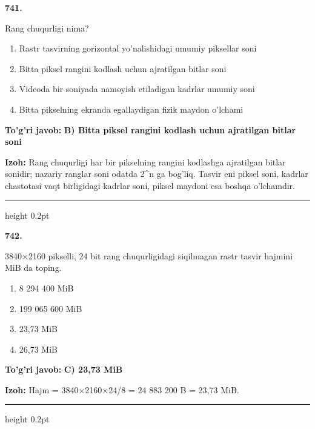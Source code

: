 \documentclass[10pt,a4paper,oneside]{article}
\begin{document}
\noindent\textbf{\color{ink}741.}
\par
Rang chuqurligi nima?
\begin{enumerate}[label=\Alph*),leftmargin=9mm]
\item Rastr tasvirning gorizontal yo'nalishidagi umumiy piksellar soni
\item Bitta piksel rangini kodlash uchun ajratilgan bitlar soni
\item Videoda bir soniyada namoyish etiladigan kadrlar umumiy soni
\item Bitta pikselning ekranda egallaydigan fizik maydon o'lchami
\end{enumerate}
\begin{tcolorbox}[enhanced,breakable,colback=teal!4,colframe=teal!50!black,boxrule=0.5pt,arc=1.1mm,left=3mm,right=3mm,top=1.7mm,bottom=1.7mm,before skip=2mm,after skip=2mm]
\textbf{\color{teal}To'g'ri javob:} \textbf{B) Bitta piksel rangini kodlash uchun ajratilgan bitlar soni}
\par\smallskip
\textbf{Izoh:} Rang chuqurligi har bir pikselning rangini kodlashga ajratilgan bitlar sonidir; nazariy ranglar soni odatda 2\textasciicircum{}n ga bog'liq. Tasvir eni piksel soni, kadrlar chastotasi vaqt birligidagi kadrlar soni, piksel maydoni esa boshqa o'lchamdir.
\end{tcolorbox}
\vspace{2mm}\hrule height 0.2pt \vspace{3mm}

\noindent\textbf{\color{ink}742.}
\par
3840\ensuremath{\times}2160 pikselli, 24 bit rang chuqurligidagi siqilmagan rastr tasvir hajmini MiB da toping.
\begin{enumerate}[label=\Alph*),leftmargin=9mm]
\item 8 294 400 MiB
\item 199 065 600 MiB
\item 23,73 MiB
\item 26,73 MiB
\end{enumerate}
\begin{tcolorbox}[enhanced,breakable,colback=teal!4,colframe=teal!50!black,boxrule=0.5pt,arc=1.1mm,left=3mm,right=3mm,top=1.7mm,bottom=1.7mm,before skip=2mm,after skip=2mm]
\textbf{\color{teal}To'g'ri javob:} \textbf{C) 23,73 MiB}
\par\smallskip
\textbf{Izoh:} Hajm = 3840\ensuremath{\times}2160\ensuremath{\times}24/8 = 24 883 200 B = 23,73 MiB.
\end{tcolorbox}
\vspace{2mm}\hrule height 0.2pt \vspace{3mm}
\end{document}
